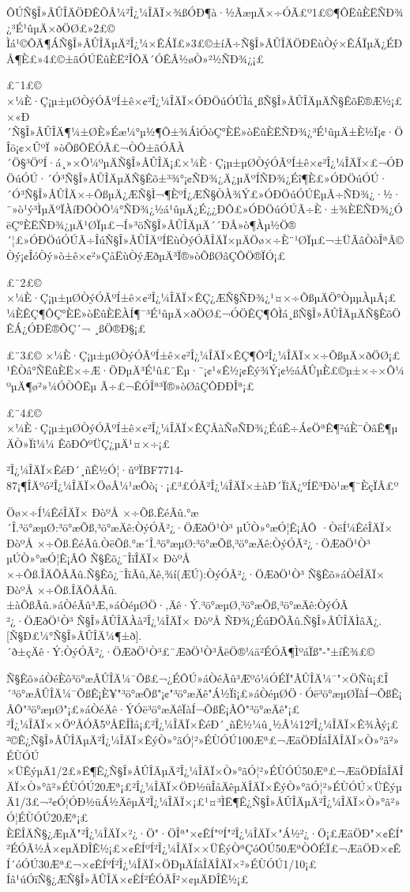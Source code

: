 ÔÚÑ§Î»ÂÛÎÄÖÐÊÕÂ¼²Î¿¼ÎÄÏ×¾ßÓÐ¶à·½ÃæµÄ×÷ÓÃ£º1£©¶ÔËûÈËÑÐ¾¿³É¹ûµÄ×ðÖØ£»2£©
Ìá¹©ÔÄ¶ÁÑ§Î»ÂÛÎÄµÄ²Î¿¼×ÊÁÏ£»3£©±íÃ÷Ñ§Î»ÂÛÎÄÖÐËùÒý×ÊÁÏµÄ¿ÉÐÅ¶È£»4£©±ãÓÚËûÈË²ÎÔÄ´ÓÊÂ½øÒ»²½ÑÐ¾¿¡£

£¨1£©	×¼È·Ç¡µ±µØÒýÓÃºÍ±ê×¢²Î¿¼ÎÄÏ×ÓÐÖúÓÚÌá¸ßÑ§Î»ÂÛÎÄµÄÑ§ÊõË®Æ½¡£
 ×«Ð´Ñ§Î»ÂÛÎÄ¶¼±ØÈ»Éæ¼°µ½¶Ô±¾ÁìÓòÇ°ÈË»òËûÈËÑÐ¾¿³É¹ûµÄ±È½Ï¡¢·ÖÎö¡¢×ÛºÏ
»òÕßÔËÓÃ£¬ÒÔ±ãÓÃÀ´Ö§³ÖºÍ·á¸»×Ô¼ºµÄÑ§Î»ÂÛÎÄ¡£×¼È·Ç¡µ±µØÒýÓÃºÍ±ê×¢²Î¿¼ÎÄÏ×£¬ÓÐÖúÓÚ·´Ó³Ñ§Î»ÂÛÎÄµÄÑ§Êõ±³¾°¡¢ÑÐ¾¿Ä¿µÄºÍÑÐ¾¿Éî¶È£»ÓÐÖúÓÚ·´Ó³Ñ§Î»ÂÛÎÄ×÷ÕßµÄ¿ÆÑ§Ì¬¶ÈºÍ¿ÆÑ§ÒÀ¾Ý£»ÓÐÖúÓÚËµÃ÷ÑÐ¾¿·½·¨»ò¹ý³ÌµÄºÏÀíÐÔÒÔ¼°ÑÐ¾¿½á¹ûµÄ¿É¿¿ÐÔ£»ÓÐÖúÓÚÃ÷È·±¾ÈËÑÐ¾¿ÓëÇ°ÈËÑÐ¾¿µÄ¹ØÏµ£¬Í»³öÑ§Î»ÂÛÎÄµÄ´´ÐÂ»ò¶Àµ½Ö®´¦£»ÓÐÖúÓÚÃ÷ÎúÑ§Î»ÂÛÎÄºÍËùÒýÓÃÎÄÏ×µÄÖø×÷È¨¹ØÏµ£¬±ÜÃâÒòÎªÂ©Òý¡¢ÎóÒý»ò±ê×¢²»ÇåËùÒýÆðµÄ³­Ï®»òÕßØâÇÔÖ®ÏÓ¡£

£¨2£©	×¼È·Ç¡µ±µØÒýÓÃºÍ±ê×¢²Î¿¼ÎÄÏ×ÊÇ¿ÆÑ§ÑÐ¾¿¹¤×÷ÕßµÄÖ°ÒµµÀµÂ¡£
 ¼ÈÊÇ¶ÔÇ°ÈË»òËûÈËÀÍ¶¯³É¹ûµÄ×ðÖØ£¬ÓÖÊÇ¶ÔÌá¸ßÑ§Î»ÂÛÎÄµÄÑ§ÊõÖÊÁ¿ÓÐË®ÕÇ´¬
¸ßÖ®Ð§¡£

£¨3£©	×¼È·Ç¡µ±µØÒýÓÃºÍ±ê×¢²Î¿¼ÎÄÏ×ÊÇ¶Ô²Î¿¼ÎÄÏ××÷ÕßµÄ×ðÖØ¡£
¹ÊÒâ°ÑËûÈË×÷Æ·ÖÐµÄ³É¹û£¨Ëµ·¨¡¢¹«Ê½¡¢Êý¾Ý¡¢½áÂÛµÈ£©µ±×÷×Ô¼ºµÄ¶ø²»¼ÓÒÔËµ
Ã÷£¬ÊÓÎª³­Ï®»òØâÇÔÐÐÎª¡£

£¨4£©	×¼È·Ç¡µ±µØÒýÓÃºÍ±ê×¢²Î¿¼ÎÄÏ×ÊÇÅàÑøÑÐ¾¿ÉúÊ÷Á¢ÖªÊ¶²úÈ¨ÒâÊ¶µÄÒ»Ïî¼¼
ÊõÐÔºÜÇ¿µÄ¹¤×÷¡£

    ²Î¿¼ÎÄÏ×ÊéÐ´¸ñÊ½Ó¦·ûºÏBF7714-87¡¶ÎÄºó²Î¿¼ÎÄÏ×ÖøÂ¼¹æÔò¡·¡£³£ÓÃ²Î¿¼ÎÄÏ×±àÐ´ÏîÄ¿ºÍË³Ðò¹æ¶¨ÈçÏÂ£º

          Öø×÷Í¼ÊéÎÄÏ×
  ÐòºÅ    ×÷Õß.ÊéÃû.°æ´Î.³ö°æµØ:³ö°æÕß,³ö°æÄê:ÒýÓÃ²¿·ÖÆðÖ¹Ò³
                                                         µÚÒ»°æÓ¦Ê¡ÂÔ
          ·­ÒëÍ¼ÊéÎÄÏ×
  ÐòºÅ    ×÷Õß.ÊéÃû.ÒëÕß.°æ´Î.³ö°æµØ:³ö°æÕß,³ö°æÄê:ÒýÓÃ²¿·ÖÆðÖ¹Ò³
                                                         µÚÒ»°æÓ¦Ê¡ÂÔ
          Ñ§Êõ¿¯ÎïÎÄÏ×
  ÐòºÅ    ×÷Õß.ÎÄÕÂÃû.Ñ§Êõ¿¯ÎïÃû,Äê,¾í(ÆÚ):ÒýÓÃ²¿·ÖÆðÖ¹Ò³
          Ñ§Êõ»áÒéÎÄÏ×
  ÐòºÅ    ×÷Õß.ÎÄÕÂÃû.±àÕßÃû.»áÒéÃû³Æ,»áÒéµØÖ·,Äê·Ý.³ö°æµØ,³ö°æÕß,³ö°æÄê:ÒýÓÃ         ²¿·ÖÆðÖ¹Ò³
           Ñ§Î»ÂÛÎÄÀà²Î¿¼ÎÄÏ×
  ÐòºÅ    ÑÐ¾¿ÉúÐÕÃû.Ñ§Î»ÂÛÎÄÌâÄ¿.[Ñ§Ð£¼°Ñ§Î»ÂÛÎÄ¼¶±ð].´ð±çÄê·Ý:ÒýÓÃ²¿·ÖÆðÖ¹Ò³£¨ÆðÖ¹Ò³ÂëÖ®¼ä²ÉÓÃ¶ÌºáÏß"-"±íÊ¾£©

    Ñ§Êõ»áÒéÈô³ö°æÂÛÎÄ¼¯Õß£¬¿ÉÔÚ»áÒéÃû³Æºó¼ÓÉÏ"ÂÛÎÄ¼¯"×ÖÑù¡£Î´³ö°æÂÛÎÄ¼¯ÕßÊ¡È¥"³ö°æÕß"¡¢"³ö°æÄê"Á½Ïî¡£»áÒéµØÖ·Óë³ö°æµØÏàÍ¬ÕßÊ¡ÂÔ"³ö°æµØ"¡£»áÒéÄê·ÝÓë³ö°æÄêÏàÍ¬ÕßÊ¡ÂÔ"³ö°æÄê"¡£
²Î¿¼ÎÄÏ××ÖºÅÓÃ5ºÅËÎÌå¡£²Î¿¼ÎÄÏ×ÊéÐ´¸ñÊ½¼û¸½Â¼12²Î¿¼ÎÄÏ×Ê¾Àý¡£
²©Ê¿Ñ§Î»ÂÛÎÄµÄ²Î¿¼ÎÄÏ×ÊýÒ»°ãÓ¦²»ÉÙÓÚ100Æª£¬ÆäÖÐÍâÎÄÎÄÏ×Ò»°ã²»ÉÙÓÚ
×ÜÊýµÄ1/2£»Ë¶Ê¿Ñ§Î»ÂÛÎÄµÄ²Î¿¼ÎÄÏ×Ò»°ãÓ¦²»ÉÙÓÚ50Æª£¬ÆäÖÐÍâÎÄÎÄÏ×Ò»°ã²»ÉÙÓÚ20Æª¡£²Î¿¼ÎÄÏ×ÖÐ½üÎåÄêµÄÎÄÏ×ÊýÒ»°ãÓ¦²»ÉÙÓÚ×ÜÊýµÄ1/3£¬²¢Ó¦ÓÐ½üÁ½ÄêµÄ²Î¿¼ÎÄÏ×¡£¹¤³ÌË¶Ê¿Ñ§Î»ÂÛÎÄµÄ²Î¿¼ÎÄÏ×Ò»°ã²»Ó¦ÉÙÓÚ20Æª¡£
ÈËÎÄÑ§¿ÆµÄ"²Î¿¼ÎÄÏ×²¿·Ö"·ÖÎª"×¢ÊÍ"ºÍ"²Î¿¼ÎÄÏ×"Á½²¿·Ö¡£ÆäÖÐ"×¢ÊÍ"²ÉÓÃ½Å×¢µÄÐÎÊ½¡£×¢ÊÍºÍ²Î¿¼ÎÄÏ××ÜÊýÒªÇóÔÚ50ÆªÒÔÉÏ£¬ÆäÖÐ×¢ÊÍ´óÓÚ30Æª£¬×¢ÊÍºÍ²Î¿¼ÎÄÏ×ÖÐµÄÍâÎÄÎÄÏ×²»ÉÙÓÚ1/10¡£
Íâ¹úÓïÑ§¿ÆÑ§Î»ÂÛÎÄ×¢ÊÍ²ÉÓÃÎ²×¢µÄÐÎÊ½¡£


